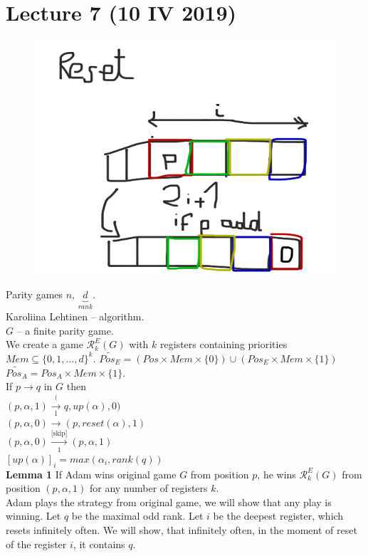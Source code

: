 \section{Lecture 7 (10 IV 2019)}
\begin{figure}[H]
    \centering
    \includegraphics[scale=0.2]{content/graphics/game7.png}
\end{figure}
Parity games $n$, $\underbrace{d}_{rank}$.\\

\noindent
Karoliina Lehtinen -- algorithm.\\
$G$ -- a finite parity game.\\
We create a game $\mathcal{R}^E_k(G)$ with $k$ registers containing priorities $Mem \subseteq \{0, 1, ..., d\}^k$.
$\widetilde{Pos_E} = (Pos \times Mem \times \{0\}) \cup (Pos_E \times Mem \times \{1\})$\\
$\widetilde{Pos_A} = Pos_A \times Mem \times \{1\}$.\\

\noindent
If $p \rightarrow q$ in $G$ then\\
$(p, \alpha, 1) \xrightarrow[\text{1}] (q, up(\alpha), 0)$\\
$(p, \alpha, 0) \rightarrow (p, reset(\alpha), 1)$\\
$(p, \alpha, 0) \xrightarrow[\text{1}]{\text{[skip]}} (p, \alpha, 1)$\\

\noindent
$[up(\alpha)]_i = max(\alpha_i, rank(q))$\\

\noindent
\textbf{Lemma 1} If Adam wins original game $G$ from position $p$,
he wins $\mathcal{R}^E_k(G)$ from position $(p, \alpha, 1)$ for any number of registers $k$.\\
Adam plays the strategy from original game, we will show that any play is winning. Let $q$ be the maximal odd rank.
Let $i$ be the deepest register, which resets infinitely often. We will show, that infinitely often,
in the moment of reset of the register $i$, it contains $q$.\\

